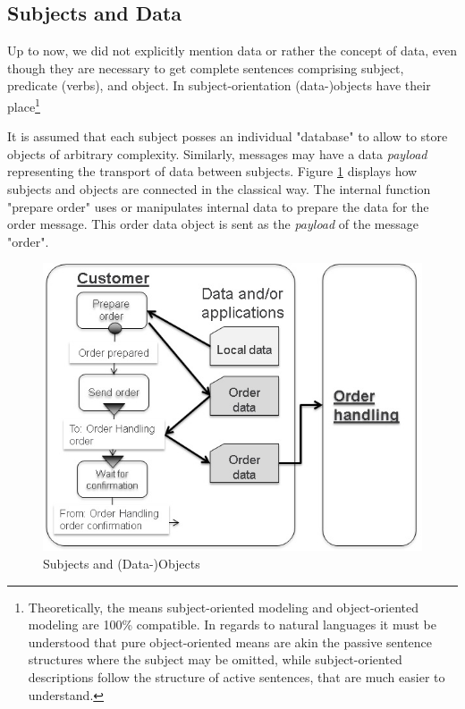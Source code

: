 \subsection{Subjects and Data}
\label{SUbjects-Objects}

Up to now, we did not explicitly mention data or rather the concept of data, even though they are necessary to get complete sentences comprising subject, predicate (verbs), and object. In subject-orientation (data-)objects have their place\footnote{Theoretically, the means subject-oriented modeling and object-oriented modeling are 100\% compatible. In regards to natural languages it must be understood that pure object-oriented means are akin the passive sentence structures where the subject may be omitted, while subject-oriented descriptions follow the structure of active sentences, that are much easier to understand.}


It is assumed that each subject posses an individual "database" to allow to store objects of arbitrary complexity. Similarly, messages may have a data \textit{payload} representing the transport of data between subjects.
Figure \ref{fig:subjectobject} displays how subjects and objects are connected in the classical way. The internal function  "prepare order" uses or manipulates internal data to prepare the data for the order message. This order data object is sent as the \textit{payload} of the message "order".

\begin{figure}[htbp]
	\centering
	\includegraphics[width=0.9\linewidth]{Figures/Ontology/SubjectBehavior/SUbjectObject}
	\caption[Subjects and (Data-)Objects]{Subjects and (Data-)Objects}
	\label{fig:subjectobject}
\end{figure}


